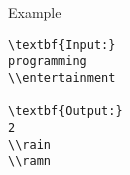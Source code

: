 Example
\begin{verbatim}
\textbf{Input:}
programming
\\entertainment

\textbf{Output:}
2
\\rain
\\ramn \end{verbatim}